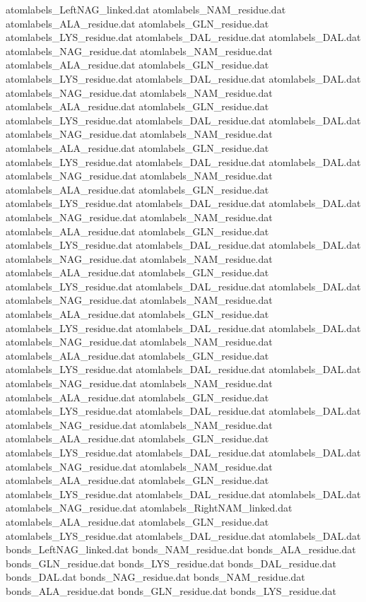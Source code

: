atomlabels_LeftNAG_linked.dat
atomlabels_NAM_residue.dat
atomlabels_ALA_residue.dat
atomlabels_GLN_residue.dat
atomlabels_LYS_residue.dat
atomlabels_DAL_residue.dat
atomlabels_DAL.dat
atomlabels_NAG_residue.dat
atomlabels_NAM_residue.dat
atomlabels_ALA_residue.dat
atomlabels_GLN_residue.dat
atomlabels_LYS_residue.dat
atomlabels_DAL_residue.dat
atomlabels_DAL.dat
atomlabels_NAG_residue.dat
atomlabels_NAM_residue.dat
atomlabels_ALA_residue.dat
atomlabels_GLN_residue.dat
atomlabels_LYS_residue.dat
atomlabels_DAL_residue.dat
atomlabels_DAL.dat
atomlabels_NAG_residue.dat
atomlabels_NAM_residue.dat
atomlabels_ALA_residue.dat
atomlabels_GLN_residue.dat
atomlabels_LYS_residue.dat
atomlabels_DAL_residue.dat
atomlabels_DAL.dat
atomlabels_NAG_residue.dat
atomlabels_NAM_residue.dat
atomlabels_ALA_residue.dat
atomlabels_GLN_residue.dat
atomlabels_LYS_residue.dat
atomlabels_DAL_residue.dat
atomlabels_DAL.dat
atomlabels_NAG_residue.dat
atomlabels_NAM_residue.dat
atomlabels_ALA_residue.dat
atomlabels_GLN_residue.dat
atomlabels_LYS_residue.dat
atomlabels_DAL_residue.dat
atomlabels_DAL.dat
atomlabels_NAG_residue.dat
atomlabels_NAM_residue.dat
atomlabels_ALA_residue.dat
atomlabels_GLN_residue.dat
atomlabels_LYS_residue.dat
atomlabels_DAL_residue.dat
atomlabels_DAL.dat
atomlabels_NAG_residue.dat
atomlabels_NAM_residue.dat
atomlabels_ALA_residue.dat
atomlabels_GLN_residue.dat
atomlabels_LYS_residue.dat
atomlabels_DAL_residue.dat
atomlabels_DAL.dat
atomlabels_NAG_residue.dat
atomlabels_NAM_residue.dat
atomlabels_ALA_residue.dat
atomlabels_GLN_residue.dat
atomlabels_LYS_residue.dat
atomlabels_DAL_residue.dat
atomlabels_DAL.dat
atomlabels_NAG_residue.dat
atomlabels_NAM_residue.dat
atomlabels_ALA_residue.dat
atomlabels_GLN_residue.dat
atomlabels_LYS_residue.dat
atomlabels_DAL_residue.dat
atomlabels_DAL.dat
atomlabels_NAG_residue.dat
atomlabels_NAM_residue.dat
atomlabels_ALA_residue.dat
atomlabels_GLN_residue.dat
atomlabels_LYS_residue.dat
atomlabels_DAL_residue.dat
atomlabels_DAL.dat
atomlabels_NAG_residue.dat
atomlabels_NAM_residue.dat
atomlabels_ALA_residue.dat
atomlabels_GLN_residue.dat
atomlabels_LYS_residue.dat
atomlabels_DAL_residue.dat
atomlabels_DAL.dat
atomlabels_NAG_residue.dat
atomlabels_RightNAM_linked.dat
atomlabels_ALA_residue.dat
atomlabels_GLN_residue.dat
atomlabels_LYS_residue.dat
atomlabels_DAL_residue.dat
atomlabels_DAL.dat
bonds_LeftNAG_linked.dat
bonds_NAM_residue.dat
bonds_ALA_residue.dat
bonds_GLN_residue.dat
bonds_LYS_residue.dat
bonds_DAL_residue.dat
bonds_DAL.dat
bonds_NAG_residue.dat
bonds_NAM_residue.dat
bonds_ALA_residue.dat
bonds_GLN_residue.dat
bonds_LYS_residue.dat
